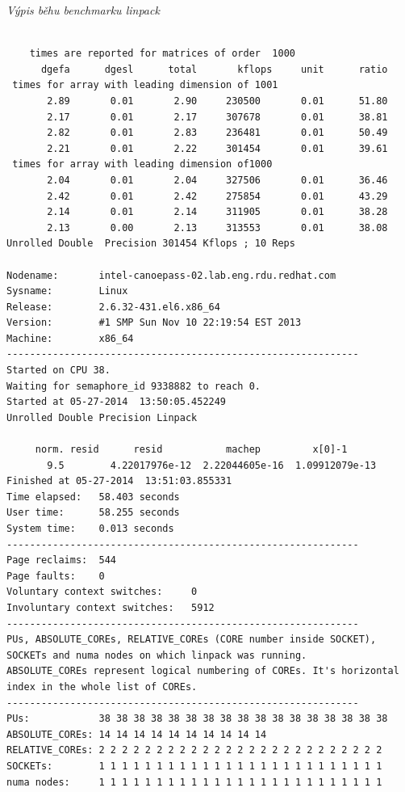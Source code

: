 \documentclass[
  master=true,
  font=sans,
  printversion=false,
  joinlists=true,
  figures=true,
  tables=true,
  sourcecodes=false,
  theorems=false,
  bibencoding=utf8,
  language=czech,
  encoding=utf8,
  field=ainfk,
  biblatex,
  glossaries,
  index
]{kidiplom}
\begin{document}
\newpage
\noindent
\textit{Výpis běhu benchmarku linpack} \\
\begingroup
\fontsize{10pt}{12pt}\selectfont
\begin{verbatim}

    times are reported for matrices of order  1000
      dgefa      dgesl      total       kflops     unit      ratio
 times for array with leading dimension of 1001
       2.89       0.01       2.90     230500       0.01      51.80
       2.17       0.01       2.17     307678       0.01      38.81
       2.82       0.01       2.83     236481       0.01      50.49
       2.21       0.01       2.22     301454       0.01      39.61
 times for array with leading dimension of1000
       2.04       0.01       2.04     327506       0.01      36.46
       2.42       0.01       2.42     275854       0.01      43.29
       2.14       0.01       2.14     311905       0.01      38.28
       2.13       0.00       2.13     313553       0.01      38.08
Unrolled Double  Precision 301454 Kflops ; 10 Reps 

Nodename:       intel-canoepass-02.lab.eng.rdu.redhat.com
Sysname:        Linux
Release:        2.6.32-431.el6.x86_64
Version:        #1 SMP Sun Nov 10 22:19:54 EST 2013
Machine:        x86_64
-------------------------------------------------------------
Started on CPU 38.
Waiting for semaphore_id 9338882 to reach 0.
Started at 05-27-2014  13:50:05.452249
Unrolled Double Precision Linpack

     norm. resid      resid           machep         x[0]-1     
       9.5        4.22017976e-12  2.22044605e-16  1.09912079e-13
Finished at 05-27-2014  13:51:03.855331
Time elapsed:   58.403 seconds
User time:      58.255 seconds
System time:    0.013 seconds
-------------------------------------------------------------
Page reclaims:  544
Page faults:    0
Voluntary context switches:     0
Involuntary context switches:   5912
-------------------------------------------------------------
PUs, ABSOLUTE_COREs, RELATIVE_COREs (CORE number inside SOCKET), 
SOCKETs and numa nodes on which linpack was running.
ABSOLUTE_COREs represent logical numbering of COREs. It's horizontal
index in the whole list of COREs.
-------------------------------------------------------------
PUs:            38 38 38 38 38 38 38 38 38 38 38 38 38 38 38 38 38 
ABSOLUTE_COREs: 14 14 14 14 14 14 14 14 14 14 
RELATIVE_COREs: 2 2 2 2 2 2 2 2 2 2 2 2 2 2 2 2 2 2 2 2 2 2 2 2 2 
SOCKETs:        1 1 1 1 1 1 1 1 1 1 1 1 1 1 1 1 1 1 1 1 1 1 1 1 1 
numa nodes:     1 1 1 1 1 1 1 1 1 1 1 1 1 1 1 1 1 1 1 1 1 1 1 1 1 

\end{verbatim}
\endgroup
\end{document}
